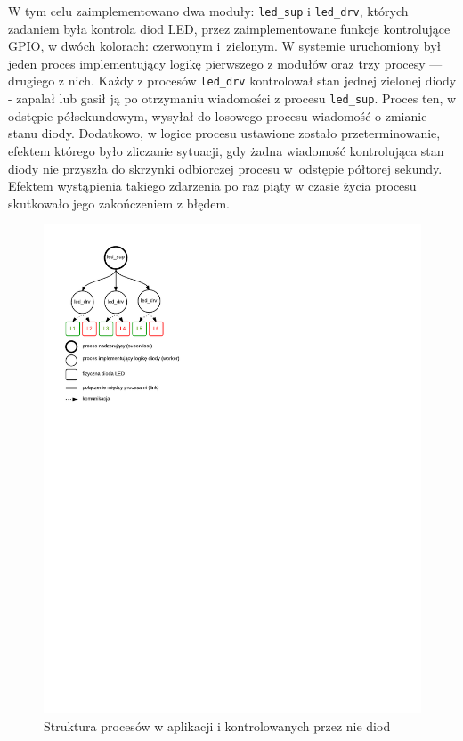W tym celu zaimplementowano dwa moduły: \texttt{led\_sup} i \texttt{led\_drv}, których zadaniem była kontrola diod LED, przez zaimplementowane funkcje kontrolujące GPIO, w dwóch kolorach: czerwonym i~zielonym.
W systemie uruchomiony był jeden proces implementujący logikę pierwszego z modułów oraz trzy procesy --- drugiego z nich.
Każdy z procesów \texttt{led\_drv} kontrolował stan jednej zielonej diody - zapalał lub gasił ją po otrzymaniu wiadomości z procesu \texttt{led\_sup}. Proces ten, w odstępie półsekundowym, wysyłał do losowego procesu wiadomość o zmianie stanu diody. Dodatkowo, w logice procesu ustawione zostało przeterminowanie, efektem którego było zliczanie sytuacji, gdy żadna wiadomość kontrolująca stan diody nie przyszła do skrzynki odbiorczej procesu w~odstępie półtorej sekundy.
Efektem wystąpienia takiego zdarzenia po raz piąty w czasie życia procesu skutkowało jego zakończeniem z błędem.

\begin{figure}[h]
\centerline{\includegraphics[scale=1, clip, trim=10mm 175mm 135mm 10mm]{example_led_processes}}
\caption{Struktura procesów w aplikacji i kontrolowanych przez nie diod}
\label{fig:exampleledprocesses}
\end{figure}


